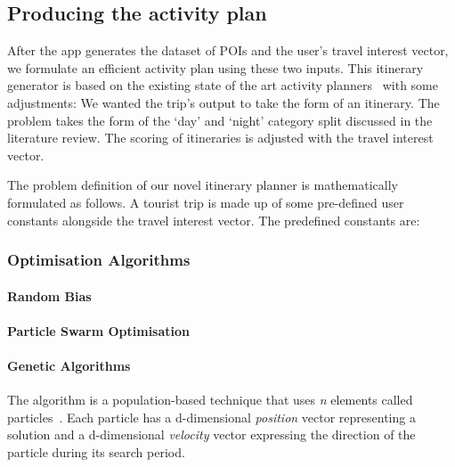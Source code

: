 
\subsection{Producing the activity plan}

After the app generates the dataset of POIs and the
user's travel interest vector, we formulate an
efficient activity plan using these two inputs. This
itinerary generator is based on the existing state of
the art activity planners~\cite{Sylejmani2017, Wisittipanich2020}
with some adjustments: We wanted the trip's output to take the
form of an itinerary.  The problem takes the form of
the `day' and `night'  category split discussed in
the literature review.  The scoring of itineraries is adjusted
with the travel interest vector.

The problem definition of our novel itinerary planner
is mathematically formulated as follows. A tourist trip is made up
of some pre-defined user constants alongside the travel interest
vector. The predefined constants are:
\\




\subsubsection{Optimisation Algorithms}

\paragraph{Random Bias}
\paragraph{Particle Swarm Optimisation}
\paragraph{Genetic Algorithms}

The algorithm is a population-based technique that uses \textit{n}
elements called particles~\cite{Kennedy}. Each particle has a
d-dimensional \textit{position} vector representing a solution
and a d-dimensional \textit{velocity} vector expressing the
direction of the particle during its search period. 

